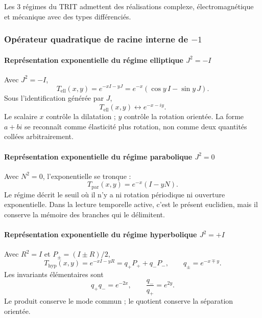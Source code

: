 \noindent Les 3 régimes du TRIT admettent des réalisations complexe, électromagnétique et mécanique avec des types différenciés.\par\medskip

\subsubsection{Opérateur quadratique de racine interne de \(-1\)}

\paragraph{Représentation exponentielle du régime elliptique \(J^2=-I\)}

Avec \(J^2=-I\),
\begin{equation}
T_{\mathrm{ell}}(x,y)=e^{-xI-yJ}
=e^{-x}(\cos y\,I-\sin y\,J).
\label{eq:elliptic-exp}
\end{equation}
Sous l'identification générée par \(J\),
\[
T_{\mathrm{ell}}(x,y)\longleftrightarrow e^{-x-iy}.
\]
Le scalaire \(x\) contrôle la dilatation ; \(y\) contrôle la rotation orientée. La forme
\(a+bi\) se reconnaît comme élasticité plus rotation, non comme deux quantités
collées arbitrairement.

\paragraph{Représentation exponentielle du régime parabolique \(J^2=0\)}

Avec \(N^2=0\), l'exponentielle se tronque :
\begin{equation}
T_{\mathrm{par}}(x,y)=e^{-x}(I-yN).
\label{eq:parabolic-exp}
\end{equation}
Le régime décrit le seuil où il n'y a ni rotation périodique ni ouverture
exponentielle. Dans la lecture temporelle active, c'est le présent euclidien, mais
il conserve la mémoire des branches qui le délimitent.

\paragraph{Représentation exponentielle du régime hyperbolique \(J^2=+I\)}

Avec \(R^2=I\) et
\(P_\pm=(I\pm R)/2\),
\begin{equation}
T_{\mathrm{hyp}}(x,y)=e^{-xI-yR}
=q_+P_++q_-P_-,
\qquad q_\pm=e^{-x\mp y}.
\label{eq:hyperbolic-exp}
\end{equation}
Les invariants élémentaires sont
\begin{equation}
q_+q_-=e^{-2x},
\qquad
\frac{q_-}{q_+}=e^{2y}.
\label{eq:q-product-ratio}
\end{equation}
Le produit conserve le mode commun ; le quotient conserve la séparation
orientée.

